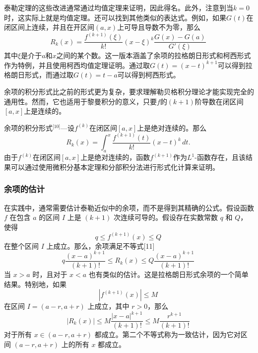 泰勒定理的这些改进通常通过均值定理来证明，因此得名。此外，注意到当\( k = 0 \) 时，这实际上就是均值定理。还可以找到其他类似的表达式。例如，如果\( G(t) \)在闭区间上连续，并且在开区间\( (a, x) \)上可导且导数不为零，那么
\[
R_k(x) = \frac{f^{(k+1)}(\xi)}{k!}(x - \xi)^k \frac{G(x) - G(a)}{G'(\xi)}~
\]
其中\( \xi \)是介于\( a \)和\( x \)之间的某个数。这一版本涵盖了余项的拉格朗日形式和柯西形式作为特例，并且使用柯西均值定理证明。通过取\( G(t) = (x - t)^{k+1} \)可以得到拉格朗日形式，而通过取\( G(t) = t - a \)可以得到柯西形式。

余项的积分形式比之前的形式更为复杂，要求理解勒贝格积分理论才能实现完全的通用性。然而，它也适用于黎曼积分的意义，只要\( f \)的\( (k+1) \)阶导数在闭区间\( [a, x] \)上是连续的。

余项的积分形式\(^\text{[10]}\)—设\( f^{(k)} \)在闭区间\( [a, x] \)上是绝对连续的。那么
\[
R_k(x) = \int_a^x \frac{f^{(k+1)}(t)}{k!} (x - t)^k \, dt.~
\]
由于\( f^{(k)} \)在闭区间\( [a, x] \)上是绝对连续的，函数\( f^{(k+1)} \)作为\( L^1 \)-函数存在，且该结果可以通过使用微积分基本定理和分部积分法进行形式化计算来证明。
\subsubsection{余项的估计}  
在实践中，通常需要估计泰勒近似中的余项，而不是得到其精确的公式。假设函数 \( f \) 在包含 \( a \) 的区间 \( I \) 上是 \( (k + 1) \) 次连续可导的。假设存在实数常数 \( q \) 和 \( Q \)，使得
\[
q \leq f^{(k+1)}(x) \leq Q~
\]
在整个区间 \( I \) 上成立。那么，余项满足不等式[11]
\[
q \frac{(x - a)^{k+1}}{(k + 1)!} \leq R_k(x) \leq Q \frac{(x - a)^{k+1}}{(k + 1)!}~
\]
当 \( x > a \) 时，且对于 \( x < a \) 也有类似的估计。这是拉格朗日形式余项的一个简单结果。特别地，如果
\[
|f^{(k+1)}(x)| \leq M~
\]
在区间 \( I = (a - r, a + r) \) 上成立，其中 \( r > 0 \)，那么
\[
|R_k(x)| \leq M \frac{|x - a|^{k+1}}{(k+1)!} \leq M \frac{r^{k+1}}{(k+1)!}~
\]
对于所有 \( x \in (a - r, a + r) \) 都成立。第二个不等式称为一致估计，因为它对区间 \( (a - r, a + r) \) 上的所有 \( x \) 都成立。